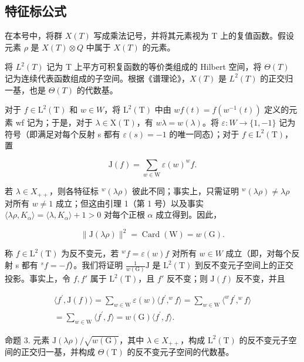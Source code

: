 \subsection{特征标公式}

在本号中，将群 \(X(T)\) 写成乘法记号，并将其元素视为 T 上的复值函数。假设元素 \(\rho\) 是 \(X(T) \otimes Q\) 中属于 \(X(T)\) 的元素。

将 \(L^{2}(T)\) 记为 T 上平方可积复函数的等价类组成的 Hilbert 空间，将 \(\Theta(T)\) 记为连续代表函数组成的子空间。根据《谱理论》，\(X(T)\) 是 \(L^{2}(T)\) 的正交归一基，也是 \(\Theta(T)\) 的代数基。

对于 \(f \in \mathrm{L}^{2}(\mathrm{T})\) 和 \(w \in W\)，将 \(\mathrm{L}^{2}(\mathrm{T})\) 中由 \(wf(t) = f(w^{-1}(t))\) 定义的元素 wf 记为；于是，对于 \(\lambda \in \mathrm{X}(\mathrm{T})\)，有 \(w\lambda = w(\lambda)\)。将 \(\varepsilon : W \to \{1, -1\}\) 记为符号（即满足对每个反射 s 都有 \(\varepsilon(s) = -1\) 的唯一同态）；对于 \(f \in \mathrm{L}^{2}(\mathrm{T})\)，置

\[
\mathrm{J} (f) = \sum_ {w \in \mathrm{W}} \varepsilon (w) ^ {w} f.
\]

若 \(\lambda \in X_{++}\)，则各特征标 \(^w (\lambda \rho)\) 彼此不同；事实上，只需证明 \(^w (\lambda \rho)\neq \lambda \rho\) 对所有 \(w\neq 1\) 成立；但这由引理 1（第 1 号）以及事实 \(\langle \lambda \rho ,K_{\alpha}\rangle = \langle \lambda ,K_{\alpha}\rangle +1 > 0\) 对每个正根 \(\alpha\) 成立得到。因此，

\[
\| \mathrm{J} (\lambda \rho) \| ^ {2} = \operatorname{Card} (\mathrm{W}) = w (\mathrm{G}).
\]

称 \(f \in \mathrm{L}^{2}(\mathrm{T})\) 为反不变元，若 \(^{w}f = \varepsilon(w)f\) 对所有 \(w \in W\) 成立（即，对每个反射 s 都有 \(^{s}f = -f\)）。我们将证明 \(\frac{1}{w(\mathrm{G})}\mathrm{J}\) 是 \(\mathrm{L}^{2}(\mathrm{T})\) 到反不变元子空间上的正交投影。事实上，令 \(f, f'\) 属于 \(\mathrm{L}^{2}(\mathrm{T})\)，且 \(f'\) 反不变；则 \(\mathrm{J}(f)\) 反不变，并且

\[
\begin{array}{c} \langle f ^ {\prime}, \mathrm{J} (f) \rangle = \sum_ {w \in \mathrm{W}} \varepsilon (w) \langle f ^ {\prime},   ^ {w} f \rangle = \sum_ {w \in \mathrm{W}} \langle^ {w} f ^ {\prime},   ^ {w} f \rangle \\ = \sum_ {w \in \mathrm{W}} \langle f ^ {\prime},   f \rangle = w (\mathrm{G}) \langle f ^ {\prime},   f \rangle . \end{array}
\]

命题 3. 元素 \(\mathrm{J}(\lambda\rho)/\sqrt{w(\mathrm{G})}\)，其中 \(\lambda\in X_{++}\)，构成 \(\mathrm{L}^{2}(\mathrm{T})\) 的反不变元子空间的正交归一基，并构成 \(\Theta(\mathrm{T})\) 的反不变元子空间的代数基。

